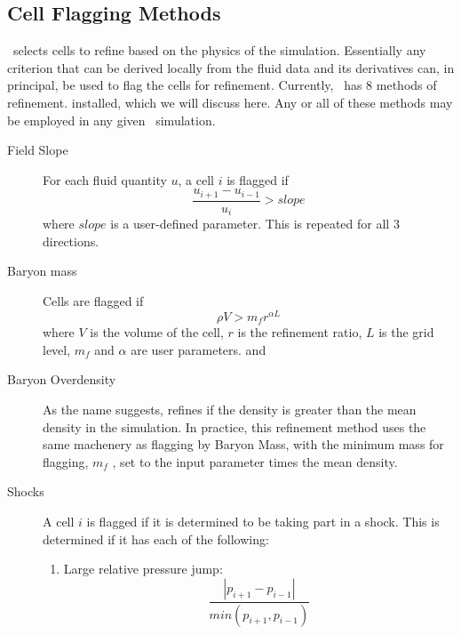 \subsection{Cell Flagging Methods}\label{sec.flagging}
\enzo\ selects cells to refine based on the physics of the simulation.
Essentially any criterion that can be derived locally from the fluid
data and its derivatives can, in principal, be used to flag the cells
for refinement. Currently, \enzo\ has 8 methods of refinement.
installed, which we will discuss here.  Any or all of these methods may be employed in
any given \enzo\ simulation.  
\begin{description}
  \item[Field Slope]  For each
  fluid quantity $u$, a cell $i$ is flagged if 
$$ \frac{u_{i+1}-u_{i-1}}{u_i} > slope $$
  where $slope$  is
  a  user-defined
  parameter. This is repeated for all
  3 directions. 
  \item[Baryon mass]   Cells
  are flagged if $$ \rho  V > m_{f} r^{\alpha L} $$ 
  where $V$ is the
  volume of the cell, $r$ is the refinement ratio, $L$ is the grid
  level, $m_{f}$ and ${\alpha}$ are user parameters.  and 
  \item[Baryon Overdensity] As the name suggests, refines if the
  density is greater than the mean density in the simulation.  In
  practice, this refinement method uses the same machenery as flagging
  by Baryon Mass, with the minimum
  mass for flagging, $m_f$ , set to the
  input parameter  times the
  mean density.  
  \item[Shocks]   A cell $i$ is flagged if it is
  determined to be taking part in a shock.  This is determined if it
  has each of the following:
  \begin{enumerate}
    \item Large relative pressure jump: 
      $$\frac{|p_{i+1} - p_{i-1}| }{min( p_{i+1}, p_{i-1} ) }
$$
\end{enumerate}
\end{description}
